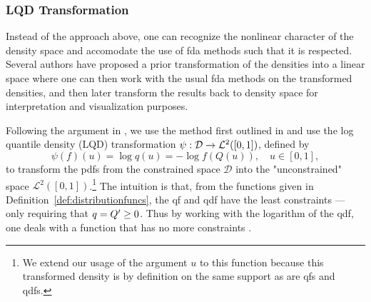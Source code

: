 \subsubsection{LQD Transformation}
\label{sec:transformation_interpretation}
Instead of the approach above, one can recognize the nonlinear character of the density
space and accomodate the use of fda methods such that it is respected. Several authors
have proposed a prior transformation of the densities into a linear space
\parencites[e.g.][]{Hron2016}[][]{PetersenMüller2016} where one can then work with the
usual fda methods on the transformed densities, and then later transform the results
back to density space for interpretation and visualization purposes.

Following the argument in \textcite{KokoszkaEtAl2019}, we use the method first outlined
in \textcite{PetersenMüller2016} and use the log quantile density (LQD) transformation
$\psi : \nobreak \mathcal{D} \to \mathcal{L}^2([0,1])$, defined by
\begin{equation}
    \label{eq:lqd_definition}
    \psi (f)(u) = \log q(u) = -\log f(Q(u)), \quad u \in [0,1],
\end{equation}
to transform the pdfs from the constrained space $\mathcal{D}$ into the "unconstrained"
space $\mathcal{L}^2([0,1])$.\footnote{We extend our usage of the argument $u$ to this
function because this transformed density is by definition on the same support as are
qfs and qdfs.} The intuition is that, from the functions given in
Definition~\ref{def:distributionfuncs}, the qf and qdf have the least constraints ---
only requiring that $q = \nobreak Q' \geq \nobreak 0$. Thus by working with the logarithm
of the qdf, one deals with a function that has no more constraints \parencite[cf.][]{KokoszkaEtAl2019}.

